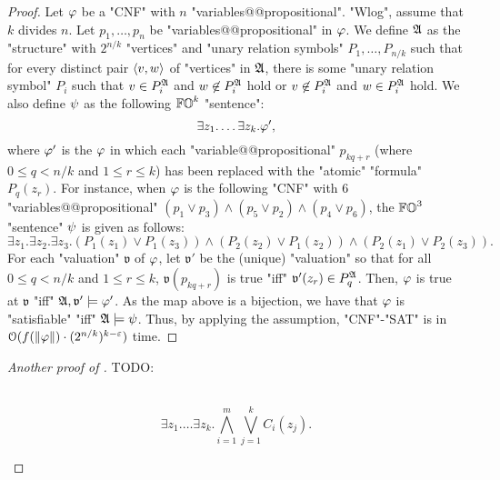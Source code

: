 \begin{proof}
    Let $\fml$ be a "CNF" with $n$ "variables@@propositional".
    "Wlog", assume that $k$ divides $n$.
    Let $p_1, \dots, p_{n}$ be "variables@@propositional" in $\fml$.
    We define $\struc$ as the "structure" with $2^{n/k}$ "vertices" and "unary relation symbols" $P_1, \dots, P_{n/k}$ such that 
    for every distinct pair $\langle v, w\rangle$ of "vertices" in $\struc$,
    there is some "unary relation symbol" $P_i$ such that
    $v \in P_i^{\struc}$ and $w \not\in P_i^{\struc}$ hold or 
    $v \not\in P_i^{\struc}$ and $w \in P_i^{\struc}$ hold.
    We also define $\fml[2]$ as the following $\mathbb{FO}^{k}$ "sentence":
    \[\exists z_1. \dots \exists z_k. \fml[1]',\]
    where $\fml[1]'$ is the $\fml$ in which
    each "variable@@propositional" $p_{kq+r}$ (where $0 \le q < n/k$ and $1 \le r \le k$) has been replaced with the "atomic" "formula" $P_q(z_r)$.
    For instance, when $\fml$ is the following "CNF" with $6$ "variables@@propositional" $(p_1 \lor p_3) \land (p_5 \lor p_2) \land (p_4 \lor p_6)$,
    the $\mathbb{FO}^{3}$ "sentence" $\fml[2]$ is given as follows:
    \[\exists z_1.\exists z_2.\exists z_3. (P_1(z_1) \lor P_1(z_3)) \land (P_2(z_2) \lor P_1(z_2)) \land (P_2(z_1) \lor P_2(z_3)).\]
    For each "valuation" $\mathfrak{v}$ of $\fml$, 
    let $\mathfrak{v}'$ be the (unique) "valuation" so that for all $0 \le q < n/k$ and $1 \le r \le k$,
    $\mathfrak{v}(p_{kq+r})$ is true "iff" $\mathfrak{v}'(z_r) \in P_q^{\struc}$.
    Then, $\fml$ is true at $\mathfrak{v}$ "iff" $\struc, \mathfrak{v}' \models \fml[1]'$.
    As the map above is a bijection, we have that $\fml$ is "satisfiable" "iff" $\struc \models \fml[2]$.
    Thus, by applying the assumption,
    "CNF"-"SAT" is in $\mathcal{O}(f(\len{\fml}) \cdot (2^{n/k})^{k-\eps})$ time.
\end{proof}

\begin{proof}[Another proof of ]
    TODO:
    \begin{yoshiki}
    \\
    \[\exists z_1. \dots \exists z_k. \bigwedge_{i = 1}^{m} \bigvee_{j = 1}^{k} C_i(z_j).\]


    \end{yoshiki}
\end{proof}


